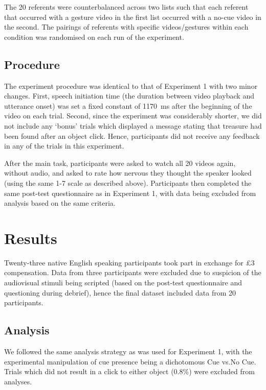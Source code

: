 \documentclass[a4paper,man,natbib]{apa6}
\begin{document}
The 20 referents were counterbalanced across two lists such that each referent that occurred with a gesture video in the first list occurred with a no-cue video in the second.
The pairings of referents with specific videos/gestures within each condition was randomised on each run of the experiment.

\subsection{Procedure}
The experiment procedure was identical to that of Experiment 1 with two minor changes.
First, speech initiation time (the duration between video playback and utterance onset) was set a fixed constant of 1170~ms after the beginning of the video on each trial.
Second, since the experiment was considerably shorter, we did not include any `bonus' trials which displayed a message stating that treasure had been found after an object click.
Hence, participants did not receive any feedback in any of the trials in this experiment.

After the main task, participants were asked to watch all 20 videos again, without audio, and asked to rate how nervous they thought the speaker looked (using the same 1-7 scale as described above).
Participants then completed the same post-test questionnaire as in Experiment 1, with data being excluded from analysis based on the same criteria.

\section{Results}
Twenty-three native English speaking participants took part in exchange for \pounds{}3 compensation. 
Data from three participants were excluded due to suspicion of the audiovisual stimuli being scripted (based on the post-test questionnaire and questioning during debrief), hence the final dataset included data from 20 participants.

\subsection{Analysis}
We followed the same analysis strategy as was used for Experiment 1, with the experimental manipulation of cue presence being a dichotomous Cue vs.\@ No Cue.
Trials which did not result in a click to either object (0.8\%) were excluded from analyses.
\end{document}

